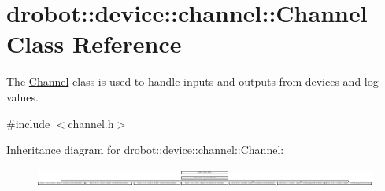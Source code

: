 \hypertarget{classdrobot_1_1device_1_1channel_1_1Channel}{\section{drobot\-:\-:device\-:\-:channel\-:\-:Channel Class Reference}
\label{classdrobot_1_1device_1_1channel_1_1Channel}
}


The \hyperlink{classdrobot_1_1device_1_1channel_1_1Channel}{Channel} class is used to handle inputs and outputs from devices and log values.  




{\ttfamily \#include $<$channel.\-h$>$}

Inheritance diagram for drobot\-:\-:device\-:\-:channel\-:\-:Channel\-:\begin{figure}[H]
\begin{center}
\leavevmode
\includegraphics[height=0.597015cm]{classdrobot_1_1device_1_1channel_1_1Channel}
\end{center}
\end{figure}
